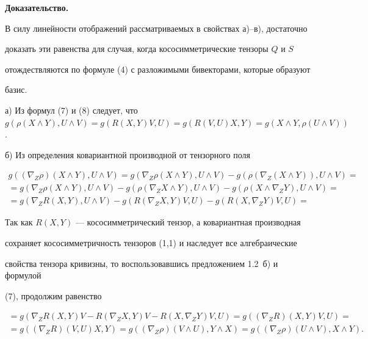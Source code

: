 {\bf Доказательство.}


В силу линейности отображений рассматриваемых в свойствах а)--в), достаточно


доказать эти равенства для случая, когда кососимметрические тензоры $Q$ и $S$


отождествляются по формуле (4) с разложимыми бивекторами, которые образуют


базис.





а) Из формул (7) и (8) следует, что $g(\rho(X\land Y),U\land V)=g(R(X,Y)V,U)=


g(R(V,U)X,Y)=g(X\land Y,\rho(U\land V))$.





б) Из определения ковариантной производной от тензорного поля


\begin{gather*}


g((\nabla_Z\rho)(X\land Y),U\land V)=g(\nabla_Z\rho(X\land Y),U\land V)-


g(\rho(\nabla_Z(X\land Y)),U\land V)=\\


=g(\nabla_Z\rho(X\land Y),U\land V)-g(\rho(\nabla_ZX\land Y),U\land V)-


g(\rho(X\land {\nabla_ZY}),U\land V)=\\


=g(\nabla_ZR(X,Y),U\land V)-g(R(\nabla_ZX,Y)V,U)-g(R(X,\nabla_ZY)V,U)=


\end{gather*}


Так как $R(X,Y)$ --- кососимметрический тензор, а ковариантная производная


сохраняет кососимметричность тензоров (1,1) и наследует все алгебраические


свойства тензора кривизны, то воспользовавшись предложением 1.2~б) и формулой


(7), продолжим равенство


\begin{gather*}


=g(\nabla_ZR(X,Y)V-R(\nabla_ZX,Y)V-R(X,\nabla_ZY)V,U)=g((\nabla_ZR)


(X,Y)V,U)=\\


=g((\nabla_ZR)(V,U)X,Y)=g((\nabla_Z\rho)(V\land U),Y\land X)=


g((\nabla_Z\rho)(U\land V),X\land Y).


\end{gather*}


